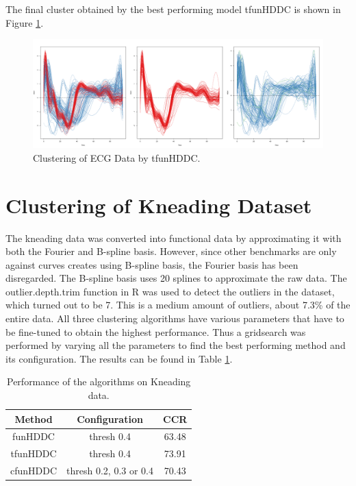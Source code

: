 \documentclass[]{article}
\begin{document}
The final cluster obtained by the best performing model tfunHDDC is shown in Figure \ref{fig:ecg_cluster}.

\begin{figure}
	\includegraphics[width=\linewidth]{ecg_cluster.png}
	\caption{Clustering of ECG Data by tfunHDDC.}
	\label{fig:ecg_cluster}
\end{figure}



\section{Clustering of Kneading Dataset}

The kneading data was converted into functional data by approximating it with both the Fourier and B-spline basis. However, since other benchmarks are only against curves creates using B-spline basis, the Fourier basis has been disregarded. The B-spline basis uses 20 splines to approximate the raw data. The outlier.depth.trim function in R was used to detect the outliers in the dataset, which turned out to be 7. This is a medium amount of outliers, about 7.3\% of the entire data. All three clustering algorithms have various parameters that have to be fine-tuned to obtain the highest performance. Thus a gridsearch was performed by varying all the parameters to find the best performing method and its configuration. The results can be found in Table \ref{tab:kneading_data}.

\begin{table}
	\centering
	\begin{tabular}{c c c} 
		\hline
		Method & Configuration & CCR \\ [0.5ex] 
		\hline
		funHDDC & thresh 0.4 & 63.48 \\ 
		
		tfunHDDC & thresh 0.4 & 73.91 \\
		
		cfunHDDC & thresh 0.2, 0.3 or 0.4 & 70.43 \\ [1ex] 
		\hline
	\end{tabular}
	\caption{Performance of the algorithms on Kneading data.}
	\label{tab:kneading_data}
\end{table}
\end{document}
